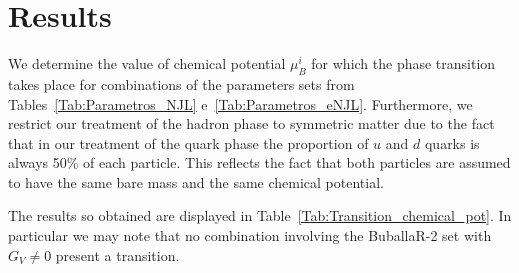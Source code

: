\documentclass[prc, reprint, amsmath, floatfix, linenumbers,10pt]{revtex4-1}
\begin{document}
\section{Results}

We determine the value of chemical potential $\mu_B^i$ for which the phase transition takes place for combinations of the parameters sets from Tables~\ref{Tab:Parametros_NJL} e~\ref{Tab:Parametros_eNJL}. Furthermore, we restrict our treatment of the hadron phase to symmetric matter due to the fact that in our treatment of the quark phase the proportion of $u$ and $d$ quarks is always 50\% of each particle. This reflects the fact that both particles are assumed to have the same bare mass and the same chemical potential.

The results so obtained are displayed in Table~\ref{Tab:Transition_chemical_pot}. In particular we may note that no combination involving the BuballaR-2 set with $G_V \neq 0$ present a transition.
\end{document}
